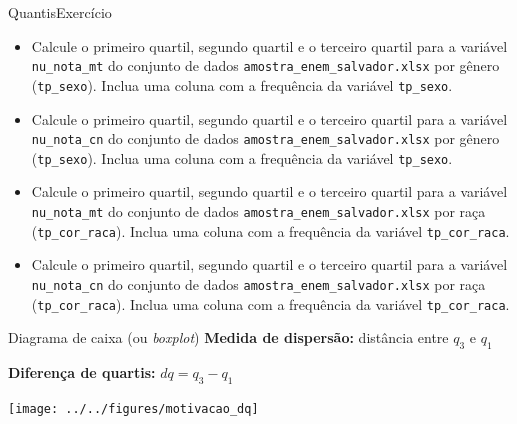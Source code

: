 \documentclass[
  10pt,
  ignorenonframetext,
]{beamer}
\providecommand{\tightlist}{%
  \setlength{\itemsep}{0pt}\setlength{\parskip}{0pt}}
\begin{document}
\begin{frame}[fragile]{Quantis\newline Exercício}
\protect\hypertarget{quantisexercuxedcio}{}
\begin{itemize}
\tightlist
\item
  Calcule o primeiro quartil, segundo quartil e o terceiro quartil para
  a variável \texttt{nu\_nota\_mt} do conjunto de dados
  \texttt{amostra\_enem\_salvador.xlsx} por gênero (\texttt{tp\_sexo}).
  Inclua uma coluna com a frequência da variável \texttt{tp\_sexo}.
\item
  Calcule o primeiro quartil, segundo quartil e o terceiro quartil para
  a variável \texttt{nu\_nota\_cn} do conjunto de dados
  \texttt{amostra\_enem\_salvador.xlsx} por gênero (\texttt{tp\_sexo}).
  Inclua uma coluna com a frequência da variável \texttt{tp\_sexo}.
\item
  Calcule o primeiro quartil, segundo quartil e o terceiro quartil para
  a variável \texttt{nu\_nota\_mt} do conjunto de dados
  \texttt{amostra\_enem\_salvador.xlsx} por raça
  (\texttt{tp\_cor\_raca}). Inclua uma coluna com a frequência da
  variável \texttt{tp\_cor\_raca}.
\item
  Calcule o primeiro quartil, segundo quartil e o terceiro quartil para
  a variável \texttt{nu\_nota\_cn} do conjunto de dados
  \texttt{amostra\_enem\_salvador.xlsx} por raça
  (\texttt{tp\_cor\_raca}). Inclua uma coluna com a frequência da
  variável \texttt{tp\_cor\_raca}.
\end{itemize}
\end{frame}

\begin{frame}{Diagrama de caixa (ou \emph{boxplot})}
\protect\hypertarget{diagrama-de-caixa-ou-boxplot}{}
\textbf{Medida de dispersão:} distância entre \(q_3\) e \(q_1\)

\textbf{Diferença de quartis:} \(dq = q_3 - q_1\)

\begin{center}\texttt{[image: ../../figures/motivacao\_dq]} \end{center}
\end{frame}
\end{document}
